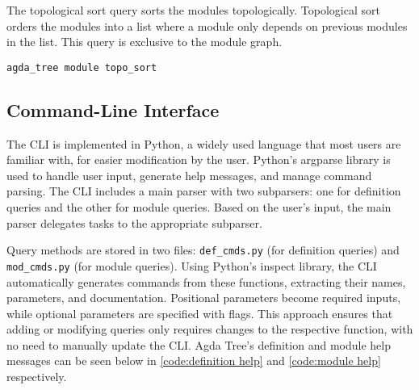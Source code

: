 The topological sort query sorts the modules topologically. Topological sort
orders the modules into a list where a module only depends on previous modules
in the list. This query is exclusive to the module graph. 

\noindent
\begin{minipage}{\textwidth}
\begin{lstlisting}
agda_tree module topo_sort
\end{lstlisting}
\end{minipage}


\subsection{Command-Line Interface}\label{sub:Agda Tree CLI}

The CLI is implemented in Python, a widely used language that most users are
familiar with, for easier modification by the user. Python's
argparse library is used to handle user input, generate help messages, and
manage command parsing. The CLI includes a main parser with two subparsers: one
for definition queries and the other for module queries. Based on the user’s
input, the main parser delegates tasks to the appropriate subparser.

Query methods are stored in two files: \texttt{def\_cmds.py} (for definition
queries) and \texttt{mod\_cmds.py} (for module queries). Using Python’s inspect
library, the CLI automatically generates commands from these functions,
extracting their names, parameters, and documentation. Positional parameters
become required inputs, while optional parameters are specified with flags.
This approach ensures that adding or modifying queries only requires changes to
the respective function, with no need to manually update the CLI. Agda Tree's
definition and module help messages can be seen below in \cref{code:definition help}
and \cref{code:module help} respectively.

